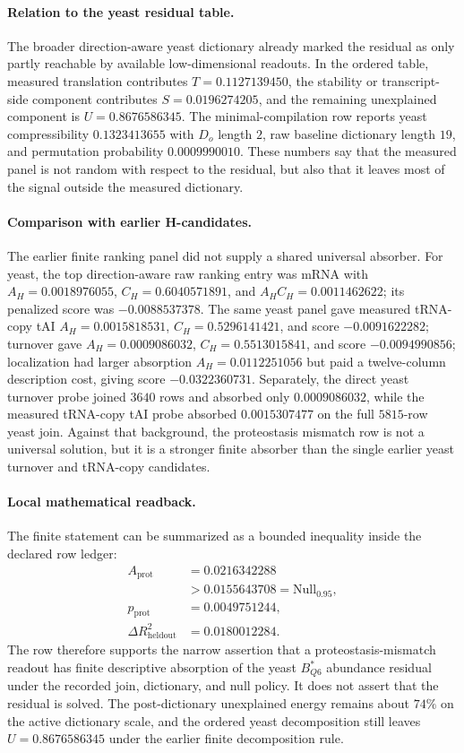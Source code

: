 \paragraph{Relation to the yeast residual table.}
The broader direction-aware yeast dictionary already marked the residual as only partly reachable by available low-dimensional readouts.  In the ordered table, measured translation contributes $T=0.1127139450$, the stability or transcript-side component contributes $S=0.0196274205$, and the remaining unexplained component is $U=0.8676586345$.  The minimal-compilation row reports yeast compressibility $0.1323413655$ with $D_o$ length $2$, raw baseline dictionary length $19$, and permutation probability $0.0009990010$.  These numbers say that the measured panel is not random with respect to the residual, but also that it leaves most of the signal outside the measured dictionary.

\paragraph{Comparison with earlier H-candidates.}
The earlier finite ranking panel did not supply a shared universal absorber.  For yeast, the top direction-aware raw ranking entry was mRNA with $A_H=0.0018976055$, $C_H=0.6040571891$, and $A_H C_H=0.0011462622$; its penalized score was $-0.0088537378$.  The same yeast panel gave measured tRNA-copy tAI $A_H=0.0015818531$, $C_H=0.5296141421$, and score $-0.0091622282$; turnover gave $A_H=0.0009086032$, $C_H=0.5513015841$, and score $-0.0094990856$; localization had larger absorption $A_H=0.0112251056$ but paid a twelve-column description cost, giving score $-0.0322360731$.  Separately, the direct yeast turnover probe joined $3640$ rows and absorbed only $0.0009086032$, while the measured tRNA-copy tAI probe absorbed $0.0015307477$ on the full $5815$-row yeast join.  Against that background, the proteostasis mismatch row is not a universal solution, but it is a stronger finite absorber than the single earlier yeast turnover and tRNA-copy candidates.

\paragraph{Local mathematical readback.}
The finite statement can be summarized as a bounded inequality inside the declared row ledger:
$$
\begin{aligned}
A_{\mathrm{prot}} &= 0.0216342288 \\ 
&> 0.0155643708 = \mathrm{Null}_{0.95},\\
p_{\mathrm{prot}} &= 0.0049751244,\\
\Delta R^2_{\mathrm{heldout}} &= 0.0180012284.
\end{aligned}
$$
The row therefore supports the narrow assertion that a proteostasis-mismatch readout has finite descriptive absorption of the yeast $B^{*}_{Q6}$ abundance residual under the recorded join, dictionary, and null policy.  It does not assert that the residual is solved.  The post-dictionary unexplained energy remains about $74\%$ on the active dictionary scale, and the ordered yeast decomposition still leaves $U=0.8676586345$ under the earlier finite decomposition rule.

